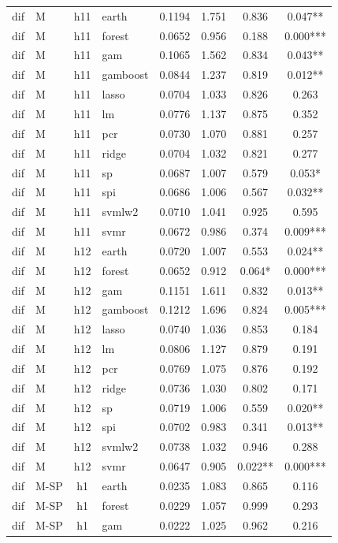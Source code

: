 \begin{ThreePartTable}
\begin{longtable}[t]{llclcccc}
\addlinespace
dif & M & h11 & earth & 0.1194 & 1.751 & 0.836 & 0.047**\\
dif & M & h11 & forest & 0.0652 & 0.956 & 0.188 & 0.000***\\
dif & M & h11 & gam & 0.1065 & 1.562 & 0.834 & 0.043**\\
dif & M & h11 & gamboost & 0.0844 & 1.237 & 0.819 & 0.012**\\
dif & M & h11 & lasso & 0.0704 & 1.033 & 0.826 & 0.263\\
dif & M & h11 & lm & 0.0776 & 1.137 & 0.875 & 0.352\\
dif & M & h11 & pcr & 0.0730 & 1.070 & 0.881 & 0.257\\
dif & M & h11 & ridge & 0.0704 & 1.032 & 0.821 & 0.277\\
dif & M & h11 & sp & 0.0687 & 1.007 & 0.579 & 0.053*\\
dif & M & h11 & spi & 0.0686 & 1.006 & 0.567 & 0.032**\\
dif & M & h11 & svmlw2 & 0.0710 & 1.041 & 0.925 & 0.595\\
dif & M & h11 & svmr & 0.0672 & 0.986 & 0.374 & 0.009***\\
\addlinespace
dif & M & h12 & earth & 0.0720 & 1.007 & 0.553 & 0.024**\\
dif & M & h12 & forest & 0.0652 & 0.912 & 0.064* & 0.000***\\
dif & M & h12 & gam & 0.1151 & 1.611 & 0.832 & 0.013**\\
dif & M & h12 & gamboost & 0.1212 & 1.696 & 0.824 & 0.005***\\
dif & M & h12 & lasso & 0.0740 & 1.036 & 0.853 & 0.184\\
dif & M & h12 & lm & 0.0806 & 1.127 & 0.879 & 0.191\\
dif & M & h12 & pcr & 0.0769 & 1.075 & 0.876 & 0.192\\
dif & M & h12 & ridge & 0.0736 & 1.030 & 0.802 & 0.171\\
dif & M & h12 & sp & 0.0719 & 1.006 & 0.559 & 0.020**\\
dif & M & h12 & spi & 0.0702 & 0.983 & 0.341 & 0.013**\\
dif & M & h12 & svmlw2 & 0.0738 & 1.032 & 0.946 & 0.288\\
dif & M & h12 & svmr & 0.0647 & 0.905 & 0.022** & 0.000***\\
\addlinespace
dif & M-SP & h1 & earth & 0.0235 & 1.083 & 0.865 & 0.116\\
dif & M-SP & h1 & forest & 0.0229 & 1.057 & 0.999 & 0.293\\
dif & M-SP & h1 & gam & 0.0222 & 1.025 & 0.962 & 0.216\\

\end{longtable}
\end{ThreePartTable}
